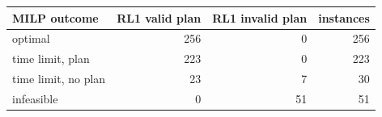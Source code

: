 \begin{tabular}{@{}lrrr@{}}
\toprule
MILP outcome & RL1 valid plan & RL1 invalid plan & instances \\
\midrule
optimal & 256 & 0 & 256 \\
time limit, plan & 223 & 0 & 223 \\
time limit, no plan & 23 & 7 & 30 \\
infeasible & 0 & 51 & 51 \\
\bottomrule
\end{tabular}
